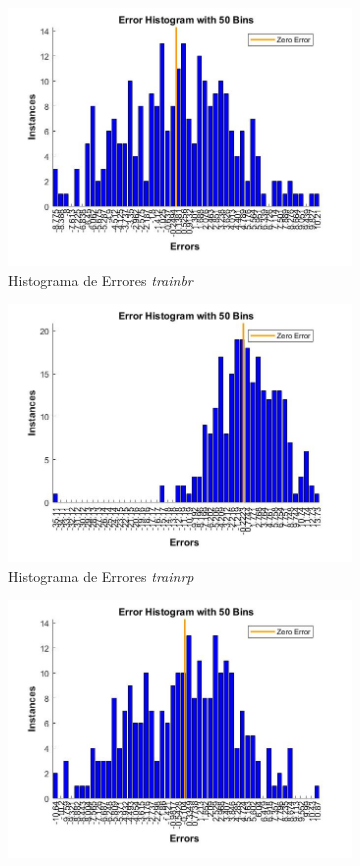 \documentclass{article}
\begin{document}
\begin{figure}[H]
 \centering
 \begin{subfigure}{0.4\textwidth}
  \includegraphics[width=0.8\linewidth]{../images/I_ex3_errorhistogram_bodyfat_dataset_trainbr.jpg}
  \caption{Histograma de Errores \textit{trainbr}}
 \end{subfigure}
 \begin{subfigure}{0.4\textwidth}
  \includegraphics[width=0.8\linewidth]{../images/I_ex3_errorhistogram_bodyfat_dataset_trainrp.jpg}
  \caption{Histograma de Errores \textit{trainrp}}
 \end{subfigure}
 \begin{subfigure}{0.4\textwidth}
  \includegraphics[width=0.8\linewidth]{../images/I_ex3_errorhistogram_bodyfat_dataset_trainoss.jpg}

\end{subfigure}
\end{figure}
\end{document}
